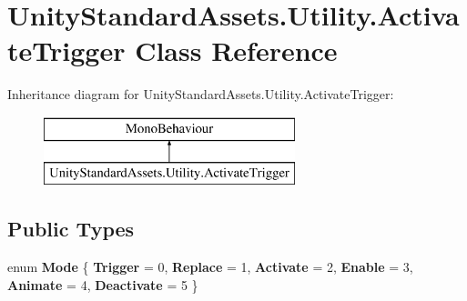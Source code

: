 \hypertarget{class_unity_standard_assets_1_1_utility_1_1_activate_trigger}{}\section{Unity\+Standard\+Assets.\+Utility.\+Activate\+Trigger Class Reference}
\label{class_unity_standard_assets_1_1_utility_1_1_activate_trigger}
Inheritance diagram for Unity\+Standard\+Assets.\+Utility.\+Activate\+Trigger\+:\begin{figure}[H]
\begin{center}
\leavevmode
\includegraphics[height=2.000000cm]{class_unity_standard_assets_1_1_utility_1_1_activate_trigger}
\end{center}
\end{figure}
\subsection*{Public Types}
\begin{DoxyCompactItemize}
\item 
\mbox{\label{class_unity_standard_assets_1_1_utility_1_1_activate_trigger_a4e33cb00af0eb967c03fbe756f487b00}} 
enum {\bfseries Mode} \{ \newline
{\bfseries Trigger} = 0, 
{\bfseries Replace} = 1, 
{\bfseries Activate} = 2, 
{\bfseries Enable} = 3, 
\newline
{\bfseries Animate} = 4, 
{\bfseries Deactivate} = 5
 \}
\end{DoxyCompactItemize}
